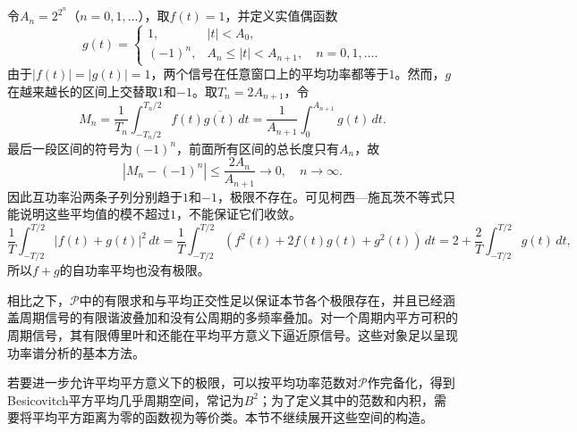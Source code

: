 \begin{example}
    令$A_n=2^{2^n}$（$n=0,1,\ldots$），取$f(t)=1$，并定义实值偶函数
    $$
        g(t)=
        \begin{cases}
            1,      & |t|<A_0,                              \\
            (-1)^n, & A_n\le|t|<A_{n+1},\quad n=0,1,\ldots.
        \end{cases}
    $$
    由于$|f(t)|=|g(t)|=1$，两个信号在任意窗口上的平均功率都等于$1$。然而，$g$在越来越长的区间上交替取$1$和$-1$。取$T_n=2A_{n+1}$，令
    $$
        M_n=\frac1{T_n}\int_{-T_n/2}^{T_n/2}
        f(t)\overline{g(t)}\,dt
        =\frac1{A_{n+1}}\int_0^{A_{n+1}}g(t)\,dt.
    $$
    最后一段区间的符号为$(-1)^n$，前面所有区间的总长度只有$A_n$，故
    $$
        |M_n-(-1)^n|\le\frac{2A_n}{A_{n+1}}\to 0,\quad n\to\infty.
    $$
    因此互功率沿两条子列分别趋于$1$和$-1$，极限不存在。可见柯西—施瓦茨不等式只能说明这些平均值的模不超过$1$，不能保证它们收敛。
    $$
        \frac1T\int_{-T/2}^{T/2}|f(t)+g(t)|^2\,dt
        =\frac{1}{T}\int_{-T/2}^{T/2}(f^2(t)+2f(t)g(t)+g^2(t))\,dt=2+\frac2T\int_{-T/2}^{T/2}g(t)\,dt,
    $$
    所以$f+g$的自功率平均也没有极限。
\end{example}

相比之下，$\mathcal{P}$中的有限求和与平均正交性足以保证本节各个极限存在，并且已经涵盖周期信号的有限谐波叠加和没有公周期的多频率叠加。对一个周期内平方可积的周期信号，其有限傅里叶和还能在平均平方意义下逼近原信号。这些对象足以呈现功率谱分析的基本方法。

若要进一步允许平均平方意义下的极限，可以按平均功率范数对$\mathcal{P}$作完备化，得到Besicovitch平方平均几乎周期空间，常记为$B^2$；为了定义其中的范数和内积，需要将平均平方距离为零的函数视为等价类。本节不继续展开这些空间的构造。
